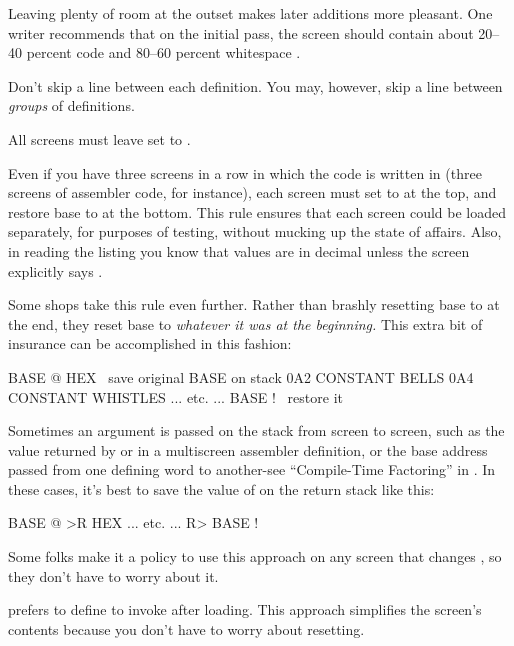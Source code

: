 Leaving plenty of room at the outset makes later additions more
pleasant.  One writer recommends that on the initial pass, the screen
should contain about 20--40 percent code and 80--60 percent
whitespace \cite{stevenson81}.

Don't skip a line between each definition.  You may, however, skip a
line between \emph{groups} of definitions.%
\begin{tip}
All screens must leave  set to .
\end{tip}
Even if you have three screens in a row in which the code is written
in  (three screens of assembler code, for instance), each
screen must set  to  at the top, and restore
base to  at the bottom.  This rule ensures that each
screen could be loaded separately, for purposes of testing, without
mucking up the state of affairs.  Also, in reading the listing you
know that values are in decimal unless the screen explicitly
says .

Some shops take this rule even further.  Rather than brashly resetting
base to  at the end, they reset base to \emph{whatever
it was at the beginning.} This extra bit of insurance can be
accomplished in this fashion:
\begin{Code}
BASE @       HEX    \ save original BASE on stack
0A2 CONSTANT BELLS
0A4 CONSTANT WHISTLES
... etc. ...
BASE !              \ restore it
\end{Code}

Sometimes an argument is passed on the stack from screen to screen,
such as the value returned by  or  in a
multiscreen assembler definition, or the base address passed from one
defining word to another-see ``Compile-Time Factoring'' in .
In these cases, it's best to save the value of  on the
return stack like this:
\begin{Code}
BASE @ >R     HEX
... etc. ...
R> BASE !
\end{Code}

Some folks make it a policy to use this approach on any screen that
changes , so they don't have to worry about it.%

 prefers to define 
to invoke  after loading.  This approach simplifies the
screen's contents because you don't have to worry about resetting.%

